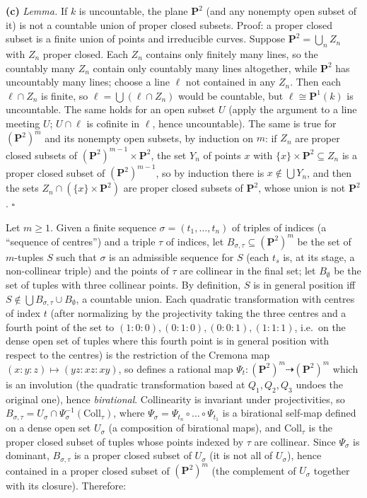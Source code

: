 \documentclass[11pt]{article}
\begin{document}
\textbf{(c)} \emph{Lemma.} If $k$ is uncountable, the plane $\mathbf P^2$ (and any nonempty open subset of it) is not a countable union of proper closed subsets. Proof: a proper closed subset is a finite union of points and irreducible curves. Suppose $\mathbf P^2=\bigcup_nZ_n$ with $Z_n$ proper closed. Each $Z_n$ contains only finitely many lines, so the countably many $Z_n$ contain only countably many lines altogether, while $\mathbf P^2$ has uncountably many lines; choose a line $\ell$ not contained in any $Z_n$. Then each $\ell\cap Z_n$ is finite, so $\ell=\bigcup(\ell\cap Z_n)$ would be countable, but $\ell\cong\mathbf P^1(k)$ is uncountable. The same holds for an open subset $U$ (apply the argument to a line meeting $U$; $U\cap\ell$ is cofinite in $\ell$, hence uncountable). The same is true for $(\mathbf P^2)^m$ and its nonempty open subsets, by induction on $m$: if $Z_n$ are proper closed subsets of $(\mathbf P^2)^{m-1}\times\mathbf P^2$, the set $Y_n$ of points $x$ with $\{x\}\times\mathbf P^2\subseteq Z_n$ is a proper closed subset of $(\mathbf P^2)^{m-1}$, so by induction there is $x\notin\bigcup Y_n$, and then the sets $Z_n\cap(\{x\}\times\mathbf P^2)$ are proper closed subsets of $\mathbf P^2$, whose union is not $\mathbf P^2$. \hfill$\square$

Let $m\ge1$. Given a finite sequence $\sigma=(t_1,\dots,t_n)$ of triples of indices (a ``sequence of centres'') and a triple $\tau$ of indices, let $B_{\sigma,\tau}\subseteq(\mathbf P^2)^m$ be the set of $m$-tuples $S$ such that $\sigma$ is an admissible sequence for $S$ (each $t_s$ is, at its stage, a non-collinear triple) and the points of $\tau$ are collinear in the final set; let $B_\emptyset$ be the set of tuples with three collinear points. By definition, $S$ is in general position iff $S\notin\bigcup B_{\sigma,\tau}\cup B_\emptyset$, a countable union. Each quadratic transformation with centres of index $t$ (after normalizing by the projectivity taking the three centres and a fourth point of the set to $(1:0:0),(0:1:0),(0:0:1),(1:1:1)$, i.e.\ on the dense open set of tuples where this fourth point is in general position with respect to the centres) is the restriction of the Cremona map $(x:y:z)\mapsto(yz:xz:xy)$, so defines a rational map $\Psi_t:(\mathbf P^2)^m\dashrightarrow(\mathbf P^2)^m$ which is an involution (the quadratic transformation based at $Q_1,Q_2,Q_3$ undoes the original one), hence \emph{birational}. Collinearity is invariant under projectivities, so $B_{\sigma,\tau}=U_\sigma\cap\Psi_\sigma^{-1}(\mathrm{Coll}_\tau)$, where $\Psi_\sigma=\Psi_{t_n}\circ\dots\circ\Psi_{t_1}$ is a birational self-map defined on a dense open set $U_\sigma$ (a composition of birational maps), and $\mathrm{Coll}_\tau$ is the proper closed subset of tuples whose points indexed by $\tau$ are collinear. Since $\Psi_\sigma$ is dominant, $B_{\sigma,\tau}$ is a proper closed subset of $U_\sigma$ (it is not all of $U_\sigma$), hence contained in a proper closed subset of $(\mathbf P^2)^m$ (the complement of $U_\sigma$ together with its closure). Therefore:
\end{document}
